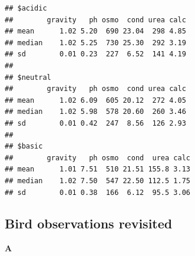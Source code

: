 \documentclass[]{book}
\newenvironment{Shaded}{\begin{snugshade}}{\end{snugshade}}
\newcommand{\DataTypeTok}[1]{\textcolor[rgb]{0.13,0.29,0.53}{#1}}
\newcommand{\DecValTok}[1]{\textcolor[rgb]{0.00,0.00,0.81}{#1}}
\newcommand{\KeywordTok}[1]{\textcolor[rgb]{0.13,0.29,0.53}{\textbf{#1}}}
\newcommand{\NormalTok}[1]{#1}
\newcommand{\OperatorTok}[1]{\textcolor[rgb]{0.81,0.36,0.00}{\textbf{#1}}}
\newcommand{\StringTok}[1]{\textcolor[rgb]{0.31,0.60,0.02}{#1}}
\begin{document}
\begin{verbatim}
## $acidic
##        gravity   ph osmo  cond urea calc
## mean      1.02 5.20  690 23.04  298 4.85
## median    1.02 5.25  730 25.30  292 3.19
## sd        0.01 0.23  227  6.52  141 4.19
## 
## $neutral
##        gravity   ph osmo  cond urea calc
## mean      1.02 6.09  605 20.12  272 4.05
## median    1.02 5.98  578 20.60  260 3.46
## sd        0.01 0.42  247  8.56  126 2.93
## 
## $basic
##        gravity   ph osmo  cond  urea calc
## mean      1.01 7.51  510 21.51 155.8 3.13
## median    1.02 7.50  547 22.50 112.5 1.75
## sd        0.01 0.38  166  6.12  95.5 3.06
\end{verbatim}

\hypertarget{bird-observations-revisited-1}{%
\subsection{Bird observations revisited}\label{bird-observations-revisited-1}}

\begin{Shaded}
\end{Shaded}

\textbf{A}

\begin{Shaded}
\end{Shaded}
\end{document}
